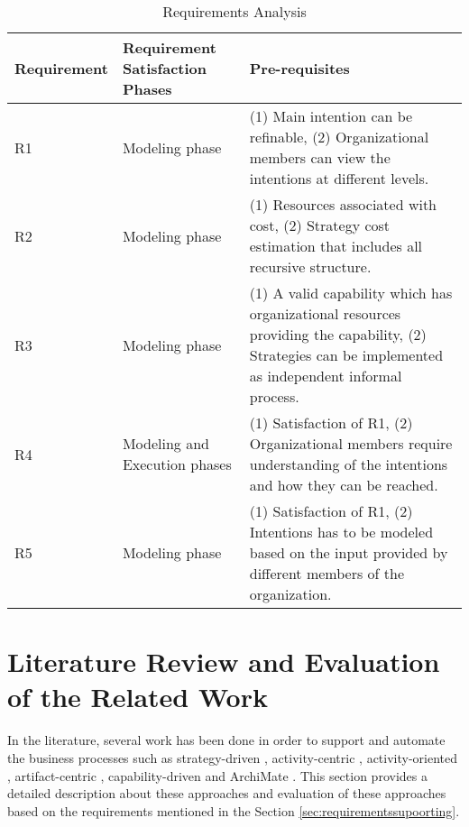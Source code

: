 \begin{table} [htbp]
	\centering
	\begin{tabular} {p{2.5cm}p{3cm}p{8cm}}
		\toprule
		\textbf{Requirement} & \textbf{Requirement Satisfaction Phases} & \textbf{Pre-requisites}    \\
		\midrule                                                                                                               
		R1    & Modeling phase    &(1) Main intention can be refinable, (2) Organizational members can view the intentions at different levels.    \\ 
		
		R2   & Modeling phase    &(1) Resources associated with cost, (2) Strategy cost estimation that includes all recursive structure. \\         
			
		R3   & Modeling phase       &(1) A valid capability which has organizational resources providing the capability, (2) Strategies can be implemented as independent informal process. \\      
		
		R4   & Modeling and Execution phases     &(1) Satisfaction of R1, (2) Organizational members require understanding of the intentions and how they can be reached. \\                         
			
		R5  &Modeling phase  &(1) Satisfaction of R1, (2) Intentions has to be modeled based on the input provided by different members of the organization.               \\ 
		    
		\bottomrule
	\end{tabular}
	\caption{Requirements Analysis}
	\label{tab:subrequirements}
\end{table}

\section{Literature Review and Evaluation of the Related Work}
\label{sec:literaturereview}
In the literature, several work has been done in order to support and automate the business processes such as strategy-driven  \cite{Bider2005}, activity-centric \cite{Yarosh2009}, activity-oriented \cite{Leymann2000}, artifact-centric \cite{Cohn2009}, capability-driven \cite{Stirna2012} and ArchiMate \cite{Group2012}. This section provides a detailed description about these approaches and evaluation of these approaches based on the requirements mentioned in the Section \ref{sec:requirementssupoorting}. 

